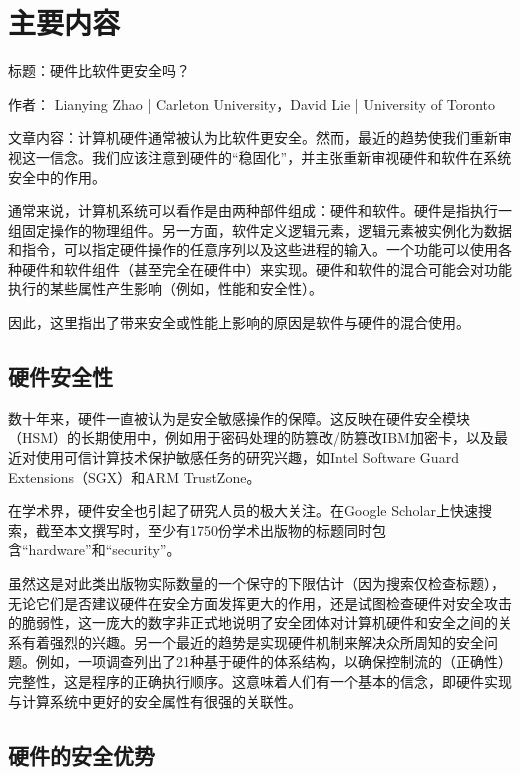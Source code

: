 \section{主要内容}

标题：硬件比软件更安全吗？

作者： Lianying Zhao | Carleton University，David Lie | University of Toronto

文章内容：计算机硬件通常被认为比软件更安全。然而，最近的趋势使我们重新审视这一信念。我们应该注意到硬件的“稳固化”，并主张重新审视硬件和软件在系统安全中的作用。

通常来说，计算机系统可以看作是由两种部件组成：硬件和软件。硬件是指执行一组固定操作的物理组件。另一方面，软件定义逻辑元素，逻辑元素被实例化为数据和指令，可以指定硬件操作的任意序列以及这些进程的输入。一个功能可以使用各种硬件和软件组件（甚至完全在硬件中）来实现。硬件和软件的混合可能会对功能执行的某些属性产生影响（例如，性能和安全性）。

\begin{tcolorbox}[title={个人理解}]
    因此，这里指出了带来安全或性能上影响的原因是软件与硬件的混合使用。
\end{tcolorbox}

\subsection{硬件安全性}

数十年来，硬件一直被认为是安全敏感操作的保障。这反映在硬件安全模块（HSM）的长期使用中，例如用于密码处理的防篡改/防篡改IBM加密卡，以及最近对使用可信计算技术保护敏感任务的研究兴趣，如Intel Software Guard Extensions（SGX）和ARM TrustZone。

在学术界，硬件安全也引起了研究人员的极大关注。在Google Scholar上快速搜索，截至本文撰写时，至少有1750份学术出版物的标题同时包含“hardware”和“security”。

虽然这是对此类出版物实际数量的一个保守的下限估计（因为搜索仅检查标题），无论它们是否建议硬件在安全方面发挥更大的作用，还是试图检查硬件对安全攻击的脆弱性，这一庞大的数字非正式地说明了安全团体对计算机硬件和安全之间的关系有着强烈的兴趣。另一个最近的趋势是实现硬件机制来解决众所周知的安全问题。例如，一项调查列出了21种基于硬件的体系结构，以确保控制流的（正确性）完整性，这是程序的正确执行顺序。这意味着人们有一个基本的信念，即硬件实现与计算系统中更好的安全属性有很强的关联性。

\subsection{硬件的安全优势}

